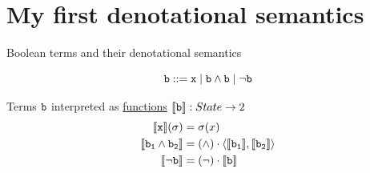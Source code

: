 \documentclass{beamer}
\begin{document}
\section{My first denotational semantics}

\begin{frame}{Boolean terms and their denotational semantics}
        \begin{block}{\vspace*{-3.5ex}}
        \[
                \mathtt{b} ::= \mathtt{x} \mid \mathtt{b} \wedge \mathtt{b} \mid \neg \mathtt{b}
        \]
        \end{block} 

        \vfill
        Terms $\mathtt{b}$ interpreted as \alert{\underline{functions}}
        $\llbracket \mathtt{b} \rrbracket : State \to 2$
        \begin{align*}
                \llbracket \mathtt{x} \rrbracket(\sigma) & = \sigma (x) \\
                \llbracket \mathtt{b_1} \wedge \mathtt{b_2} \rrbracket & 
                = (\wedge) \cdot \langle \llbracket \mathtt{b_1} \rrbracket, \llbracket \mathtt{b_2} \rrbracket \rangle \\
                \llbracket \neg \mathtt{b} \rrbracket & = (\neg) \cdot \llbracket \mathtt{b} \rrbracket
        \end{align*}
\end{frame}
\end{document}
